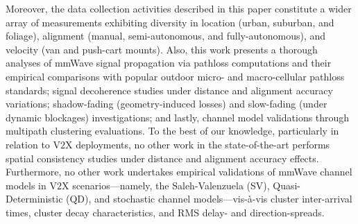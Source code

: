 \documentclass[12pt, draftcls, onecolumn]{IEEEtran}
\renewcommand{\tabcolsep}{2pt}
\begin{document}
Moreover, the data collection activities described in this paper constitute a wider array of measurements exhibiting diversity in location (urban, suburban, and foliage), alignment (manual, semi-autonomous, and fully-autonomous), and velocity (van and push-cart mounts). Also, this work presents a thorough analyses of mmWave signal propagation via pathloss computations and their empirical comparisons with popular outdoor micro- and macro-cellular pathloss standards; signal decoherence studies under distance and alignment accuracy variations; shadow-fading (geometry-induced losses) and slow-fading (under dynamic blockages) investigations; and lastly, channel model validations through multipath clustering evaluations. To the best of our knowledge, particularly in relation to V$2$X deployments, no other work in the state-of-the-art performs spatial consistency studies under distance and alignment accuracy effects. Furthermore, no other work undertakes empirical validations of mmWave channel models in V$2$X scenarios---namely, the Saleh-Valenzuela (SV), Quasi-Deterministic (QD), and stochastic channel models---vis-\`{a}-vis cluster inter-arrival times, cluster decay characteristics, and RMS delay- and direction-spreads.
\renewcommand{\tabcolsep}{4.5pt}
\end{document}
